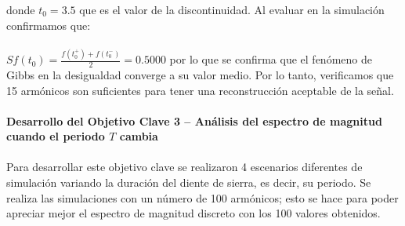 \documentclass[7pt]{article}
\begin{document}
    donde $t_0=3.5$ que es el valor de la discontinuidad. Al evaluar en la simulación 
    confirmamos que:\\
    \\
     $Sf(t_0)=\frac{f(t_0^+)+f(t_0^-)}{2}=0.5000$ por lo que se confirma que el fenómeno de Gibbs 
     en la desigualdad converge a su valor medio. Por lo tanto, verificamos que 15 armónicos 
     son suficientes para tener una reconstrucción aceptable de la señal. \\
     \\
     \textbf{Desarrollo del Objetivo Clave 3 -- Análisis del espectro de magnitud cuando el periodo $T$ cambia}
     \\
     \\
     Para desarrollar este objetivo clave se realizaron 4 escenarios diferentes de simulación variando la 
     duración del diente de sierra, es decir, su periodo. Se realiza las simulaciones con un número 
     de 100 armónicos; esto se hace para poder apreciar mejor el espectro de magnitud 
     discreto con los 100 valores obtenidos.
\end{document}
